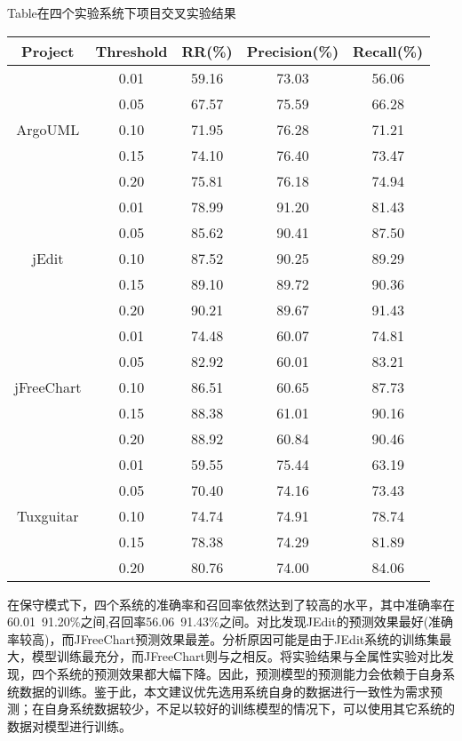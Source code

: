 \begin{table}[htbp]
{Table$\!$}{在四个实验系统下项目交叉实验结果}
\vspace{0.5em}\centering\wuhao
\begin{tabular}{ccccc}
\toprule[1.5pt]
\textbf{Project}&\textbf{Threshold}&\textbf{RR(\%)}&\textbf{Precision(\%)}&\textbf{Recall(\%)}\\
\midrule[1pt]
\multirow{5}{*}{ArgoUML}
&0.01&	59.16&	73.03&	56.06\\
&0.05&	67.57&	75.59&	66.28\\
&0.10&	71.95&	76.28&	71.21\\
&0.15&	74.10&	76.40&	73.47\\
&0.20&	75.81&	76.18&	74.94\\

\multirow{5}{*}{jEdit}
&0.01&	78.99&	91.20&	81.43\\
&0.05&	85.62&	90.41&	87.50\\
&0.10&	87.52&	90.25&	89.29\\
&0.15&	89.10&	89.72&	90.36\\
&0.20&	90.21&	89.67&	91.43\\

\multirow{5}{*}{jFreeChart}
&0.01&	74.48&	60.07&	74.81\\
&0.05&	82.92&	60.01&	83.21\\
&0.10&	86.51&	60.65&	87.73\\
&0.15&	88.38&	61.01&	90.16\\
&0.20&	88.92&	60.84&	90.46\\

\multirow{5}{*}{Tuxguitar}
&0.01&	59.55&	75.44&	63.19\\
&0.05&	70.40&	74.16&	73.43\\
&0.10&	74.74&	74.91&	78.74\\
&0.15&	78.38&	74.29&	81.89\\
&0.20&	80.76&	74.00&	84.06\\

\bottomrule[1.5pt]
\end{tabular}
\end{table}

在保守模式下，四个系统的准确率和召回率依然达到了较高的水平，其中准确率在60.01~91.20\%之间,召回率56.06~91.43\%之间。对比发现JEdit的预测效果最好(准确率较高)，而JFreeChart预测效果最差。分析原因可能是由于JEdit系统的训练集最大，模型训练最充分，而JFreeChart则与之相反。将实验结果与全属性实验对比发现，四个系统的预测效果都大幅下降。因此，预测模型的预测能力会依赖于自身系统数据的训练。鉴于此，本文建议优先选用系统自身的数据进行一致性为需求预测；在自身系统数据较少，不足以较好的训练模型的情况下，可以使用其它系统的数据对模型进行训练。

